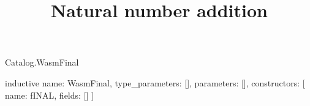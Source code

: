 \begin{lexlean}{Catalog.WasmFinal}
\title{Natural number addition}
\begin{semanticmodule}
inductive{
  name: WasmFinal,
  type_parameters: [],
  parameters: [],
  constructors: [
    {name: fINAL, fields: []}
  ]
}
\end{semanticmodule}
\end{lexlean}
